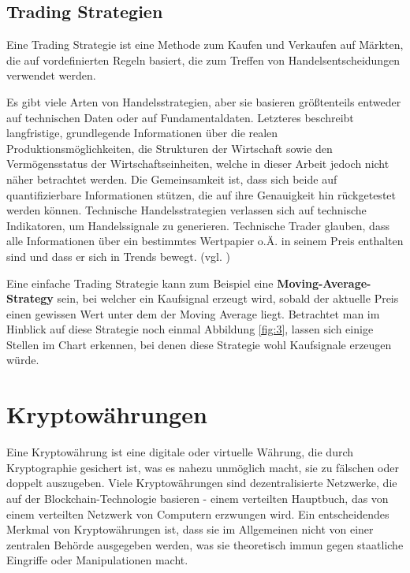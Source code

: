\documentclass[oneside]{ausarbeitung}
\begin{document}
\subsection{Trading Strategien}
\label{sub:trading_strategien}

Eine Trading Strategie ist eine Methode zum Kaufen und Verkaufen auf
Märkten, die auf vordefinierten Regeln basiert, die zum Treffen von
Handelsentscheidungen verwendet werden\cite{trading_strategy}.

Es gibt viele Arten von Handelsstrategien, aber sie basieren
größtenteils entweder auf technischen Daten oder auf
Fundamentaldaten. Letzteres beschreibt langfristige, grundlegende
Informationen über die realen Produktionsmöglichkeiten, die
Strukturen der Wirtschaft sowie den Vermögensstatus der
Wirtschaftseinheiten, welche in dieser Arbeit jedoch nicht näher
betrachtet werden\cite{fundamentaldaten}. Die Gemeinsamkeit ist, dass
sich beide auf quantifizierbare Informationen stützen, die auf ihre
Genauigkeit hin rückgetestet werden können.
Technische Handelsstrategien verlassen sich auf technische
Indikatoren, um Handelssignale zu generieren. Technische Trader
glauben, dass alle Informationen über ein bestimmtes Wertpapier o.Ä.
in seinem Preis enthalten sind und dass er sich in Trends bewegt.
(vgl. \cite{trading_strategy}) 

Eine einfache Trading Strategie kann zum Beispiel eine
\textbf{Moving-Average-Strategy} sein, bei welcher ein Kaufsignal
erzeugt wird, sobald der aktuelle Preis einen gewissen Wert unter dem
der Moving Average liegt. Betrachtet man im Hinblick auf diese
Strategie noch einmal Abbildung \ref{fig:3}, lassen sich einige
Stellen im Chart erkennen, bei denen diese Strategie wohl Kaufsignale
erzeugen würde. 


\section{Kryptowährungen}
\label{sec:kryptowährungen}

Eine Kryptowährung ist eine digitale oder virtuelle Währung, die
durch Kryptographie gesichert ist, was es nahezu unmöglich macht, sie
zu fälschen oder doppelt auszugeben. Viele Kryptowährungen sind
dezentralisierte Netzwerke, die auf der Blockchain-Technologie
basieren - einem verteilten Hauptbuch, das von einem verteilten
Netzwerk von Computern erzwungen wird. Ein entscheidendes Merkmal von
Kryptowährungen ist, dass sie im Allgemeinen nicht von einer
zentralen Behörde ausgegeben werden, was sie theoretisch immun gegen
staatliche Eingriffe oder Manipulationen macht.
\end{document}
